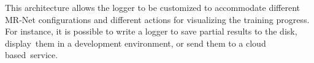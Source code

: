 This architecture allows the logger to be customized to accommodate different MR-Net configurations and different actions for visualizing the training progress. For instance, it is possible to write a logger to save partial results to the disk, display~them in a development environment, or send them to a cloud based~service.









